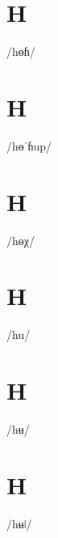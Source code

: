 \documentclass[10pt,a4paper,twoside]{book}
\begin{document}
\section*{H}

\begin{multicols}{3}
 {/hɵɦ/} {}
\end{multicols}

\section*{H}

\begin{multicols}{3}
 {/hɵˈɦup/} {}
\end{multicols}

\section*{H}

\begin{multicols}{3}
 {/hɵχ/} {}
\end{multicols}

\section*{H}

\begin{multicols}{3}
 {/hu/} {}
\end{multicols}

\section*{H}

\begin{multicols}{3}
 {/hʉ/} {}
\end{multicols}

\section*{H}

\begin{multicols}{3}
 {/hʉǀ/} {}
\end{multicols}
\end{document}
